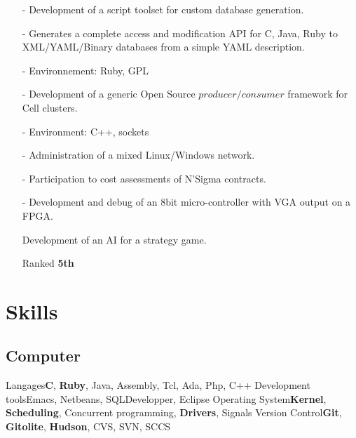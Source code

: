 \documentclass[10pt,a4paper]{moderncv}
\begin{document}
{
\begin{itemize}
\item[-]{Development of a script toolset for custom database generation.}
\item[-]{Generates a complete access and modification API for C, Java, Ruby to XML/YAML/Binary databases from a simple YAML description.}
\item[-]{Environnement: Ruby, GPL}
\end{itemize}
}
{
\begin{itemize}
\item[-]{Development of a generic Open Source $producer/consumer$ framework for Cell clusters.}
\item[-]{Environment: C++, sockets}
\end{itemize}
}
{
\begin{itemize}
\item[-]{Administration of a mixed Linux/Windows network.}
\item[-]{Participation to cost assessments of N'Sigma contracts.}
\end{itemize}
}

{
\begin{itemize}
\item[-]{Development and debug of an 8bit micro-controller with VGA output on a FPGA.}
\end{itemize}
}

{
\begin{itemize}
\item[]{Development of an AI for a strategy game.}
\item[]{Ranked \textbf{5th}}
\end{itemize}
}

\section{Skills}
\subsection{Computer}
\cvcomputer
{Langages}{\textbf{C}, \textbf{Ruby}, Java, Assembly, Tcl, Ada, Php, C++}
{Development tools}{Emacs, Netbeans, SQLDevelopper, Eclipse}
\cvcomputer
{Operating System}{\textbf{Kernel}, \textbf{Scheduling}, Concurrent programming, \textbf{Drivers}, Signals}
{Version Control}{\textbf{Git}, \textbf{Gitolite}, \textbf{Hudson}, CVS, SVN, SCCS}
\end{document}
